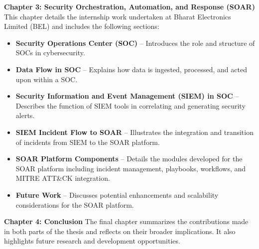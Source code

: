 \documentclass[12pt, twoside, a4paper]{report}
\begin{document}
\textbf{Chapter 3: Security Orchestration, Automation, and Response (SOAR)}  
This chapter details the internship work undertaken at Bharat Electronics Limited (BEL) and includes the following sections:
\begin{itemize}[noitemsep, topsep=0pt]
    \item \textbf{Security Operations Center (SOC)} – Introduces the role and structure of SOCs in cybersecurity.
    \item \textbf{Data Flow in SOC} – Explains how data is ingested, processed, and acted upon within a SOC.
    \item \textbf{Security Information and Event Management (SIEM) in SOC} – Describes the function of SIEM tools in correlating and generating security alerts.
    \item \textbf{SIEM Incident Flow to SOAR} – Illustrates the integration and transition of incidents from SIEM to the SOAR platform.
    \item \textbf{SOAR Platform Components} – Details the modules developed for the SOAR platform including incident management, playbooks, workflows, and MITRE ATT\&CK integration.
    \item \textbf{Future Work} – Discusses potential enhancements and scalability considerations for the SOAR platform.
\end{itemize}

\textbf{Chapter 4: Conclusion}  
The final chapter summarizes the contributions made in both parts of the thesis and reflects on their broader implications. It also highlights future research and development opportunities.



\baselineskip=16pt	%


\renewcommand{\bibname}{References}

\end{document}
